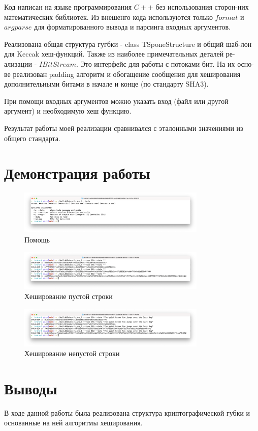 \documentclass[a4paper]{article}
\begin{document}
  Код написан на языке программирования $C++$ без использования сторон-них математических
  библиотек. Из внешенго кода используются только $format$ и $argparse$ для
  форматированного вывода и парсинга входных аргументов.

  Реализована общая структура гугбки - class TSponeStructure и общий шаб-лон 
  для Keccak хеш-функций. Также из наиболее примечательных деталей ре-ализации -
  $IBitStream$. Это интерфейс для работы с потоками бит. На их осно-ве реализован
  padding алгоритм и обогащение сообщения для хеширования дополнительными битами
  в начале и конце (по стандарту SHA3).

  При помощи входных аргументов можно указать вход (файл или другой аргумент)
  и необходимую хеш функцию.

  Результат работы моей реализации сравнивался с эталонными значениями из
  общего стандарта.

  \newpage
  \section{Демонстрация работы}

  \begin{figure}[H]
    \centering
    \includegraphics[width=0.8\textwidth]{sha3_1.png}
    \caption{Помощь}
  \end{figure}

  \begin{figure}[H]
    \centering
    \includegraphics[width=0.8\textwidth]{sha3_2.png}
    \caption{Хеширование пустой строки}
  \end{figure}

  \begin{figure}[H]
    \centering
    \includegraphics[width=0.8\textwidth]{sha3_3.png}
    \caption{Хеширование непустой строки}
  \end{figure}

  \newpage
  \section{Выводы}
  
  В ходе данной работы была реализована структура криптографической губки
  и основанные на ней алгоритмы хеширования.
\end{document}
